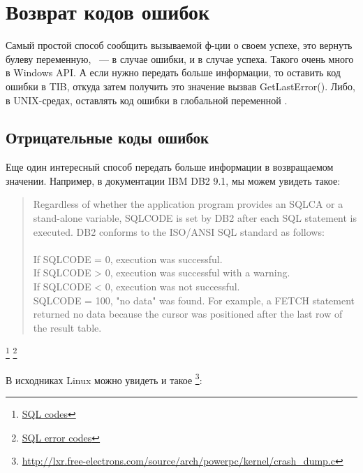﻿\section{Возврат кодов ошибок}

Самый простой способ сообщить вызываемой ф-ции о своем успехе, это вернуть булеву переменную, 
 ~--- в случае ошибки, и  в случае успеха. Такого очень много в Windows API.
А если нужно передать больше информации, то оставить код ошибки в \ac{TIB}, откуда затем получить 
это значение вызвав GetLastError(). Либо, в UNIX-средах, оставлять код ошибки в глобальной переменной .

\subsection{Отрицательные коды ошибок}

Еще один интересный способ передать больше информации в возвращаемом значении. Например, в документации IBM DB2 9.1,
мы можем увидеть такое:

\begin{framed}
\begin{quotation}
Regardless of whether the application program provides an SQLCA or a stand-alone variable, SQLCODE is set by DB2 after each SQL statement is executed. DB2 conforms to the ISO/ANSI SQL standard as follows:\\
\\
If SQLCODE = 0, execution was successful.\\
If SQLCODE > 0, execution was successful with a warning.\\
If SQLCODE < 0, execution was not successful.\\
SQLCODE = 100, "no data" was found. For example, a FETCH statement returned no data because the cursor was positioned after the last row of the result table.
\end{quotation}
\end{framed}
\footnote{\href{http://publib.boulder.ibm.com/infocenter/dzichelp/v2r2/index.jsp?topic=\%2Fcom.ibm.db2z9.doc.codes\%2Fsrc\%2Ftpc\%2Fdb2z\_sqlcodes.htm}{SQL codes}}
\footnote{\href{http://publib.boulder.ibm.com/infocenter/dzichelp/v2r2/index.jsp?topic=\%2Fcom.ibm.db2z9.doc.codes\%2Fsrc\%2Ftpc\%2Fdb2z\_n.htm}{SQL error codes}}

В исходниках Linux можно увидеть и такое
\footnote{\url{http://lxr.free-electrons.com/source/arch/powerpc/kernel/crash_dump.c}}:

